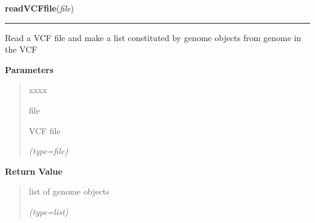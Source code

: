 \hspace{.8\funcindent}\begin{boxedminipage}{\funcwidth}

    \raggedright \textbf{readVCFfile}(\textit{file})

    \vspace{-1.5ex}

    \rule{\textwidth}{0.5\fboxrule}
\setlength{\parskip}{2ex}
    Read a VCF file and make a list constituted by genome objects from 
    genome in the VCF

\setlength{\parskip}{1ex}
      \textbf{Parameters}
      \vspace{-1ex}

      \begin{quote}
        \begin{Ventry}{xxxx}

          \item[file]

          VCF file

            {\it (type=file)}

        \end{Ventry}

      \end{quote}

      \textbf{Return Value}
    \vspace{-1ex}

      \begin{quote}
      list of genome objects

      {\it (type=list)}

      \end{quote}

    \end{boxedminipage}

    \label{script-phyloFixedVar:selectPosSensible}

    \vspace{0.5ex}

